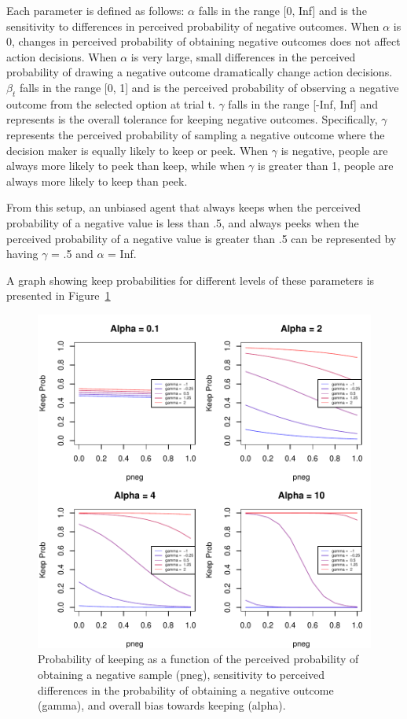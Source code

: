 \documentclass[a4paper,doc,natbib,floatsintext]{apa6}\usepackage[]{graphicx}\usepackage[]{color}
\begin{document}
Each parameter is defined as follows: $\alpha$ falls in the range [0, Inf] and is the sensitivity to differences in perceived probability of negative outcomes. When $\alpha$ is 0, changes in perceived probability of obtaining negative outcomes does not affect action decisions. When $\alpha$ is very large, small differences in the perceived probability of drawing a negative outcome dramatically change action decisions. $\beta_{t}$ falls in the range [0, 1] and is the perceived probability of observing a negative outcome from the selected option at trial t. $\gamma$ falls in the range [-Inf, Inf] and represents is the overall tolerance for keeping negative outcomes. Specifically, $\gamma$ represents the perceived probability of sampling a negative outcome where the decision maker is equally likely to keep or peek. When $\gamma$ is negative, people are always more likely to peek than keep, while when $\gamma$ is greater than 1, people are always more likely to keep than peek.

From this setup, an unbiased agent that always keeps when the perceived probability of a negative value is less than .5, and always peeks when the perceived probability of a negative value is greater than .5 can be represented by having $\gamma$ = .5 and $\alpha$ = Inf.

A graph showing keep probabilities for different levels of these parameters is presented in Figure~\ref{fig:actionpneg}



\begin{center}
\begin{figure}
\includegraphics[width=12cm]{keepneg.pdf}
\caption{Probability of keeping as a function of the perceived probability of obtaining a negative sample (pneg), sensitivity to perceived differences in the probability of obtaining a negative outcome (gamma), and overall bias towards keeping (alpha).}
\label{fig:actionpneg}
\end{figure}
\end{center}
\end{document}
